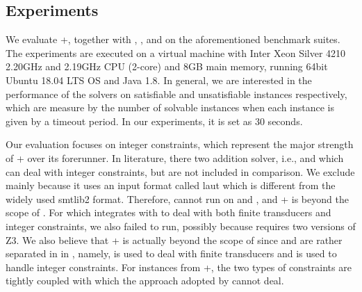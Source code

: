 \subsection{Experiments}\label{sec:exp-res}

We evaluate {\ostrich}+, together with {\cvc} \cite{cvc4}, {\zthree} \cite{Z3-str}, and {\zthreetrau} \cite{Z3-trau} on the aforementioned benchmark suites. 
The experiments are executed on a virtual machine with Inter Xeon Silver 4210 2.20GHz and 2.19GHz CPU (2-core) and 8GB main memory, running 64bit Ubuntu 18.04 LTS OS and Java 1.8. In general, we are interested in the performance of the solvers on satisfiable and unsatisfiable instances respectively, which are measure by the number of solvable instances  when each instance is given by a timeout period. In our experiments, it is set as 30 seconds. %

Our evaluation focuses on integer constraints, which represent the major strength of {\ostrich}+ over its forerunner. In literature, there two addition solver, i.e., {\slent} and  {\trauplus} which can deal with integer constraints, but are not included in comparison.  We exclude {\slent}  mainly because it uses an input format called laut which is different from the widely used smtlib2 format. Therefore, %
{\slent} cannot run on {\kaluzabench} and {\pyexbench}, and {\transducerbench}+ is beyond the scope of {\slent}.  
%
For {\trauplus} which integrates {\trau} with {\sloth} to deal with both finite transducers and integer constraints, we also failed to run, possibly because {\trau} requires two versions of Z3.  We also believe that {\transducerbench}+ is actually beyond the scope of {\trauplus} since   {\trau} and {\sloth} are rather separated in in {\trauplus}, namely, {\sloth} is used to deal with finite transducers and {\trau} is used to handle integer constraints. For instances from {\transducerbench}+, the two types of constraints are tightly coupled with which the approach adopted by  {\trauplus} cannot deal. %


